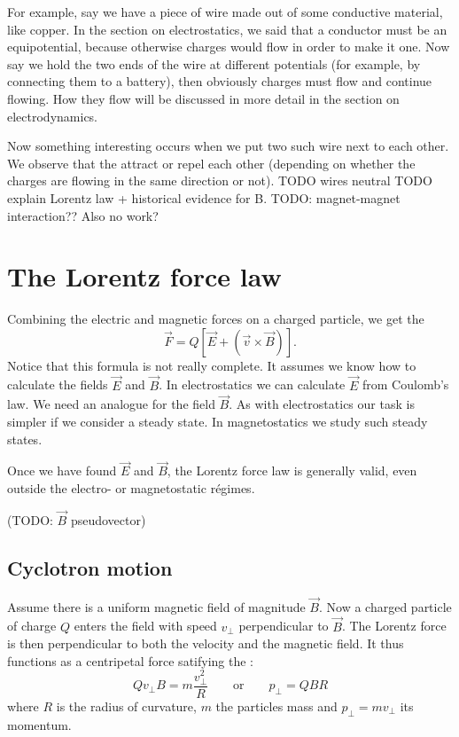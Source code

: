 For example, say we have a piece of wire made out of some conductive material, like copper. In the section on electrostatics, we said that a conductor must be an equipotential, because otherwise charges would flow in order to make it one. Now say we hold the two ends of the wire at different potentials (for example, by connecting them to a battery), then obviously charges must flow and continue flowing. How they flow will be discussed in more detail in the section on electrodynamics.

Now something interesting occurs when we put two such wire next to each other. We observe that the attract or repel each other (depending on whether the charges are flowing in the same direction or not).
TODO wires neutral
TODO explain Lorentz law + historical evidence for B.
TODO: magnet-magnet interaction?? Also no work?


\section{The Lorentz force law}
Combining the electric and magnetic forces on a charged particle, we get the 
\[ \vec{F} = Q[\vec{E} + (\vec{v}\times \vec{B})]. \]
Notice that this formula is not really complete. It assumes we know how to calculate the fields $\vec{E}$ and $\vec{B}$. In electrostatics we can calculate $\vec{E}$ from Coulomb's law. We need an analogue for the field $\vec{B}$. As with electrostatics our task is simpler if we consider a steady state. In magnetostatics we study such steady states.

Once we have found $\vec{E}$ and $\vec{B}$, the Lorentz force law is generally valid, even outside the electro- or magnetostatic régimes.

(TODO: $\vec{B}$ pseudovector)


\subsection{Cyclotron motion}
Assume there is a uniform magnetic field of magnitude $\vec{B}$. Now a charged particle of charge $Q$ enters the field with speed $v_\perp$ perpendicular to $\vec{B}$. The Lorentz force is then perpendicular to both the velocity and the magnetic field. It thus functions as a centripetal force satifying the :
\[ Qv_\perp B = m \frac{v_\perp^2}{R} \qquad \text{or} \qquad p_\perp = QBR \]
where $R$ is the radius of curvature, $m$ the particles mass and $p_\perp=mv_\perp$ its momentum.

